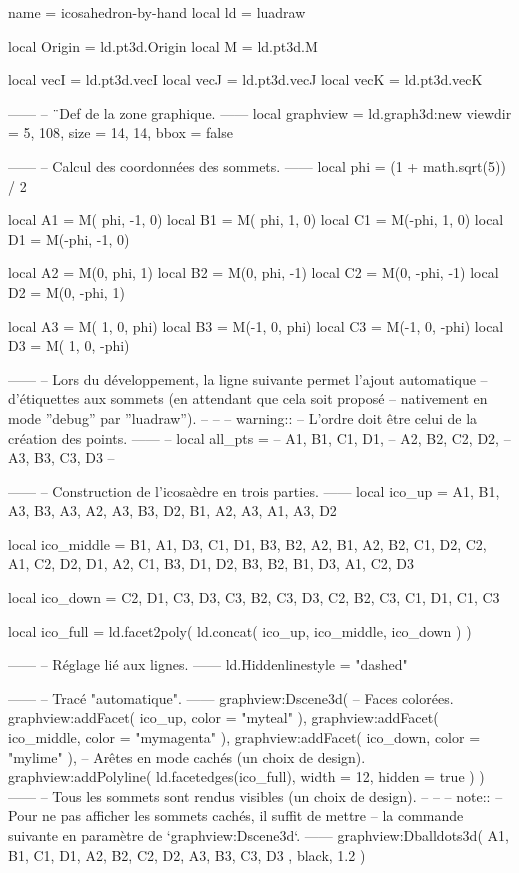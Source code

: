 \documentclass[border = 3pt]{standalone}
\begin{document}
\begin{luadraw*}{name = icosahedron-by-hand}
local ld = luadraw

local Origin = ld.pt3d.Origin
local M      = ld.pt3d.M

local vecI = ld.pt3d.vecI
local vecJ = ld.pt3d.vecJ
local vecK = ld.pt3d.vecK

------
-- ¨Def de la zone graphique.
------
local graphview = ld.graph3d:new{
  viewdir  = {5, 108},
  size     = {14, 14},
  bbox     = false
}

------
-- Calcul des coordonnées des sommets.
------
local phi = (1 + math.sqrt(5)) / 2

local A1 = M( phi, -1, 0)
local B1 = M( phi,  1, 0)
local C1 = M(-phi,  1, 0)
local D1 = M(-phi, -1, 0)

local A2 = M(0,  phi,  1)
local B2 = M(0,  phi, -1)
local C2 = M(0, -phi, -1)
local D2 = M(0, -phi,  1)

local A3 = M( 1, 0,  phi)
local B3 = M(-1, 0,  phi)
local C3 = M(-1, 0, -phi)
local D3 = M( 1, 0, -phi)

------
-- Lors du développement, la ligne suivante permet l'ajout automatique
-- d'étiquettes aux sommets (en attendant que cela soit proposé
-- nativement en mode ''debug'' par ''luadraw'').
--
--
--  warning::
--      L'ordre doit être celui de la création des points.
------
-- local all_pts = {
--   A1, B1, C1, D1,
--   A2, B2, C2, D2,
--   A3, B3, C3, D3
-- }

------
-- Construction de l'icosaèdre en trois parties.
------
local ico_up = {
  {A1, B1, A3},
  {B3, A3, A2},
  {A3, B3, D2},
  {B1, A2, A3},
  {A1, A3, D2}
}

local ico_middle = {
  {B1, A1, D3},
  {C1, D1, B3},
  {B2, A2, B1},
  {A2, B2, C1},
  {D2, C2, A1},
  {C2, D2, D1},
  {A2, C1, B3},
  {D1, D2, B3},
  {B2, B1, D3},
  {A1, C2, D3}
}

local ico_down = {
  {C2, D1, C3},
  {D3, C3, B2},
  {C3, D3, C2},
  {B2, C3, C1},
  {D1, C1, C3}
}

local ico_full = ld.facet2poly(
  ld.concat(
    ico_up,
    ico_middle,
    ico_down
  )
)

------
-- Réglage lié aux lignes.
------
ld.Hiddenlinestyle = "dashed"

------
-- Tracé "automatique".
------
graphview:Dscene3d(
-- Faces colorées.
  graphview:addFacet(
    ico_up,
    {
      color = "myteal"
    }
  ),
  graphview:addFacet(
    ico_middle,
    {
      color = "mymagenta"
    }
  ),
  graphview:addFacet(
    ico_down,
    {
      color = "mylime"
    }
  ),
-- Arêtes en mode cachés (un choix de design).
  graphview:addPolyline(
    ld.facetedges(ico_full),
    {
      width = 12,
      hidden = true
    }
  )
)
------
-- Tous les sommets sont rendus visibles (un choix de design).
--
--
-- note::
--     Pour ne pas afficher les sommets cachés, il suffit de mettre
--     la commande suivante en paramètre de `graphview:Dscene3d`.
------
graphview:Dballdots3d(
  {
    A1, B1, C1, D1,
    A2, B2, C2, D2,
    A3, B3, C3, D3
  },
  black,
  1.2
)


\end{luadraw*}
\end{document}
